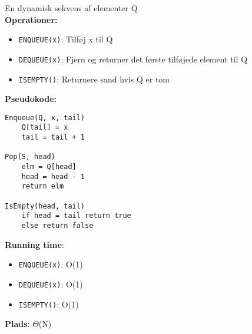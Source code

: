 En dynamisk sekvens af elementer Q\\
\textbf{Operationer:}
\begin{itemize}
	\item \texttt{ENQUEUE(x)}: Tilføj x til Q
	\item \texttt{DEQUEUE(x)}: Fjern og returner det første tilføjede element til Q
	\item \texttt{ISEMPTY()}: Returnere sand hvis Q er tom
\end{itemize}
\textbf{Pseudokode:}
\begin{lstlisting}[frame=single, mathescape=true]
Enqueue(Q, x, tail)
	Q[tail] = x
	tail = tail + 1

Pop(S, head)
	elm = Q[head]
	head = head - 1
	return elm

IsEmpty(head, tail)
	if head = tail return true
	else return false
\end{lstlisting}
\textbf{Running time}:
\begin{itemize}
	\item \texttt{ENQUEUE(x)}: O(1)
	\item \texttt{DEQUEUE(x)}: O(1)
	\item \texttt{ISEMPTY()}: O(1)
\end{itemize}
\textbf{Plads}: $\Theta$(N)
